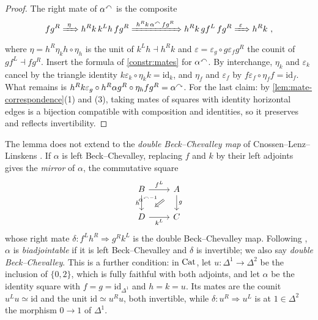 \begin{proof}
%
The right mate of ${\alpha}^{\curvearrowleft}$ is the composite
\begin{equation*}
fg^{R} \xRightarrow{\ \eta\ } h^{R}k\,k^{L}h\,fg^{R}
\xRightarrow{\ h^{R}k\,{\alpha}^{\curvearrowleft}\,fg^{R}\ } h^{R}k\,gf^{L}\,fg^{R}
\xRightarrow{\ \varepsilon\ } h^{R}k \ ,
\end{equation*}
where
$\eta = h^{R}\eta_{k}h \circ \eta_{h}$
is the unit of $k^{L}h \dashv h^{R}k$ and
$\varepsilon = \varepsilon_{g} \circ g\varepsilon_{f}g^{R}$
the counit of $gf^{L} \dashv fg^{R}$. Insert the formula of \cref{constr:mates}
for ${\alpha}^{\curvearrowleft}$. 
By interchange,
$\eta_{k}$ and $\varepsilon_{k}$ cancel by the triangle identity
$k\varepsilon_{k} \circ \eta_{k}k = \mathrm{id}_{k}$,
and $\eta_{f}$ and $\varepsilon_{f}$ by
$f\varepsilon_{f} \circ \eta_{f}f = \mathrm{id}_{f}$.
What remains is
$h^{R}k\varepsilon_{g} \circ h^{R}\alpha g^{R} \circ \eta_{h}fg^{R} =
{\alpha}^{\curvearrowright}$.
For the last claim: by \cref{lem:mate-correspondence}(1) and (3),
taking mates of squares with identity horizontal edges is a bijection compatible
with composition and identities, so it preserves and reflects invertibility.
\end{proof}

\begin{rmk}
\label{rmk:double-BC}
%
The lemma does not extend to the \emph{double Beck--Chevalley map} of
Cnossen--Lenz--Linskens \cite[Def.~2.1(4)]{cnossenlenzlinskens2025universal}.
If $\alpha$ is left Beck--Chevalley, replacing $f$ and $k$ by their left
adjoints gives the \emph{mirror} of $\alpha$, the commutative square
\begin{equation*}
\begin{tikzcd}
B \ar[r, "f^{L}"] \ar[d, "h"'] & A \ar[d, "g"] \ar[dl, Rightarrow, shorten=3mm,
"{\lmate{\alpha}}^{-1}"'] \\
D \ar[r, "k^{L}"'] & C
\end{tikzcd}
\end{equation*}
whose right mate
$\delta\colon f^{L}h^{R} \Rightarrow g^{R}k^{L}$
is the double Beck--Chevalley map. Following
\cite{cnossenlenzlinskens2025universal},
$\alpha$ is \emph{biadjointable} if it is left Beck--Chevalley and $\delta$ is
invertible; we also say \emph{double Beck--Chevalley}.
This is a further condition: in $\mathrm{Cat}$, let
$u\colon \Delta^{1} \to \Delta^{2}$
be the inclusion of $\{0,2\}$, which is fully faithful with both adjoints,
and let $\alpha$ be the identity square with
$f = g = \mathrm{id}_{\Delta^{1}}$
and $h = k = u$. Its mates are the counit
$u^{L}u \simeq \mathrm{id}$
and the unit
$\mathrm{id} \simeq u^{R}u$,
both invertible, while
$\delta\colon u^{R} \Rightarrow u^{L}$
is at $1 \in \Delta^{2}$ the morphism $0 \to 1$ of $\Delta^{1}$.
\end{rmk}

